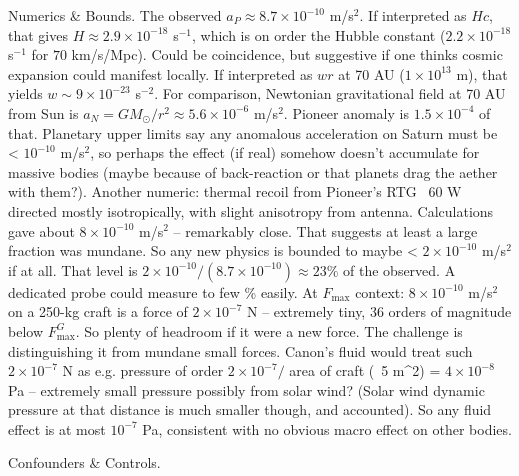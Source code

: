 \documentclass[11pt]{article}
\begin{document}
Numerics & Bounds. The observed $a_P \approx 8.7\times10^{-10}$ m/s$^2$. If interpreted as $Hc$, that gives $H \approx 2.9\times10^{-18}$ s$^{-1}$, which is on order the Hubble constant ($2.2\times10^{-18}$ s$^{-1}$ for $70$ km/s/Mpc). Could be coincidence, but suggestive if one thinks cosmic expansion could manifest locally. If interpreted as $w r$ at 70 AU ($1\times10^{13}$ m), that yields $w \sim 9\times10^{-23}$ s$^{-2}$. For comparison, Newtonian gravitational field at 70 AU from Sun is $a_N=GM_{\odot}/r^2 \approx 5.6\times10^{-6}$ m/s$^2$. Pioneer anomaly is $1.5\times10^{-4}$ of that. Planetary upper limits say any anomalous acceleration on Saturn must be < $10^{-10}$ m/s$^2$, so perhaps the effect (if real) somehow doesn’t accumulate for massive bodies (maybe because of back-reaction or that planets drag the aether with them?). Another numeric: thermal recoil from Pioneer’s RTG ~60 W directed mostly isotropically, with slight anisotropy from antenna. Calculations gave about $8\times10^{-10}$ m/s$^2$ – remarkably close. That suggests at least a large fraction was mundane. So any new physics is bounded to maybe < $2\times10^{-10}$ m/s$^2$ if at all. That level is $2\times10^{-10}/(8.7\times10^{-10}) \approx 23\%$ of the observed. A dedicated probe could measure to few \% easily. At $F_{\max}$ context: $8\times10^{-10}$ m/s$^2$ on a 250-kg craft is a force of $2\times10^{-7}$ N – extremely tiny, 36 orders of magnitude below $F_{\max}^{G}$. So plenty of headroom if it were a new force. The challenge is distinguishing it from mundane small forces. Canon’s fluid would treat such $2\times10^{-7}$ N as e.g. pressure of order $2\times10^{-7} /$ area of craft (~5 m^2) = $4\times10^{-8}$ Pa – extremely small pressure possibly from solar wind? (Solar wind dynamic pressure at that distance is much smaller though, and accounted). So any fluid effect is at most $10^{-7}$ Pa, consistent with no obvious macro effect on other bodies.


Confounders & Controls.
\end{document}
